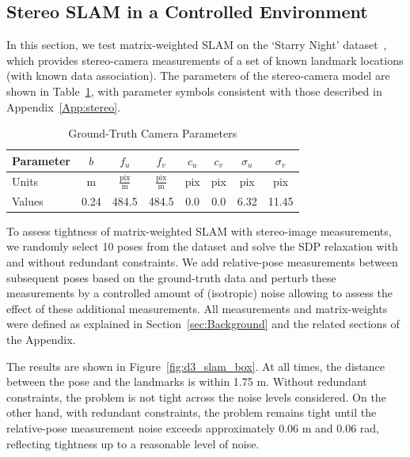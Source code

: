 \documentclass[lettersize,journal]{IEEEtran}
\begin{document}
\subsection{Stereo SLAM in a Controlled Environment}\label{sec:stereoslam_starry}

In this section, we test matrix-weighted SLAM on the `Starry Night' dataset~\cite{barfoot2011state}, which provides stereo-camera measurements of a set of known landmark locations (with known data association). The parameters of the stereo-camera model are shown in Table~\ref{tbl:cam_params}, with parameter symbols consistent with those described in Appendix~\ref{App:stereo}.

\begin{table}[H]
	\caption{Ground-Truth Camera Parameters}\label{tbl:cam_params}
	\centering
    \begin{tabular}{ |l|c|c|c|c|c|c|c| }
    \hline
    Parameter& $b $ & $f_u$ & $f_v$ & $c_u$ & $c_v$ & $\sigma_u$ &  $\sigma_v$ \\ \hline
	Units& m & $\frac{\mbox{pix}}{\mbox{m}}$ & $\frac{\mbox{pix}}{\mbox{m}}$ & pix & pix & pix & pix \\
	\hline
    Values & 0.24 & 484.5  & 484.5  & 0.0  &  0.0 & 6.32 &  11.45 \\
	\hline
    \end{tabular} 
\end{table}

To assess tightness of matrix-weighted SLAM with stereo-image measurements, we randomly select 10 poses from the dataset and solve the SDP relaxation with and without redundant constraints. We add relative-pose measurements between subsequent poses based on the ground-truth data and perturb these measurements by a controlled amount of (isotropic) noise allowing to assess the effect of these additional measurements. All measurements and matrix-weights were defined as explained in Section~\ref{sec:Background} and the related sections of the Appendix.

The results are shown in Figure~\ref{fig:d3_slam_box}. At all times, the distance between the pose and the landmarks is within 1.75 m.  Without redundant constraints, the problem is not tight across the noise levels considered. On the other hand, with redundant constraints, the problem remains tight until the relative-pose measurement noise exceeds approximately 0.06 m and 0.06 rad, reflecting tightness up to a reasonable level of noise. 
\end{document}
